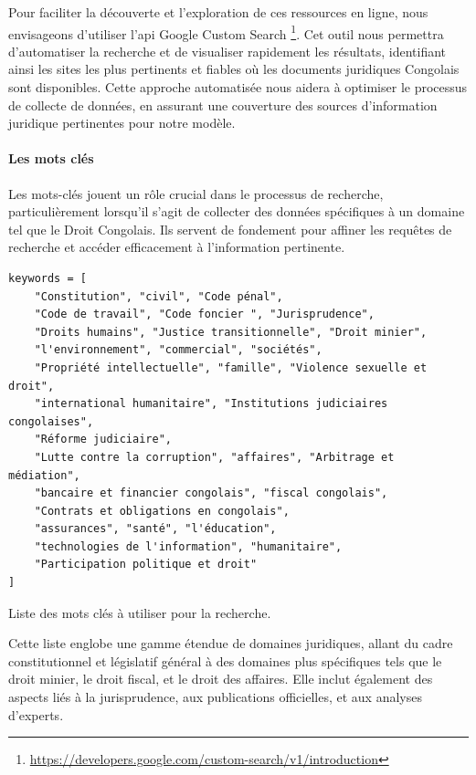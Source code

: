 Pour faciliter la découverte et l'exploration de ces ressources en ligne, nous envisageons d'utiliser l'\acs{api} Google Custom Search \footnote{\href{https://developers.google.com/custom-search/v1/introduction}{https://developers.google.com/custom-search/v1/introduction}}. Cet outil nous permettra d'automatiser la recherche et de visualiser rapidement les résultats, identifiant ainsi les sites les plus pertinents et fiables où les documents juridiques Congolais sont disponibles. Cette approche automatisée nous aidera à optimiser le processus de collecte de données, en assurant une couverture des sources d'information juridique pertinentes pour notre modèle.

\newpage
\paragraph{Les mots clés} \hspace{0pt}

Les mots-clés jouent un rôle crucial dans le processus de recherche, particulièrement lorsqu'il s'agit de collecter des données spécifiques à un domaine tel que le Droit Congolais. Ils servent de fondement pour affiner les requêtes de recherche et accéder efficacement à l'information pertinente.

\begin{listing}[!ht]
\begin{verbatim}
keywords = [
    "Constitution", "civil", "Code pénal",
    "Code de travail", "Code foncier ", "Jurisprudence",
    "Droits humains", "Justice transitionnelle", "Droit minier",
    "l'environnement", "commercial", "sociétés",
    "Propriété intellectuelle", "famille", "Violence sexuelle et droit",
    "international humanitaire", "Institutions judiciaires congolaises", 
    "Réforme judiciaire",
    "Lutte contre la corruption", "affaires", "Arbitrage et médiation",
    "bancaire et financier congolais", "fiscal congolais", 
    "Contrats et obligations en congolais",
    "assurances", "santé", "l'éducation",
    "technologies de l'information", "humanitaire",
    "Participation politique et droit"
]
\end{verbatim}
\caption{Liste des mots clés à utiliser pour la recherche.}
\label{appendix:code:python:search-keywords}
\end{listing}

Cette liste englobe une gamme étendue de domaines juridiques, allant du cadre constitutionnel et législatif général à des domaines plus spécifiques tels que le droit minier, le droit fiscal, et le droit des affaires. Elle inclut également des aspects liés à la jurisprudence, aux publications officielles, et aux analyses d'experts.

